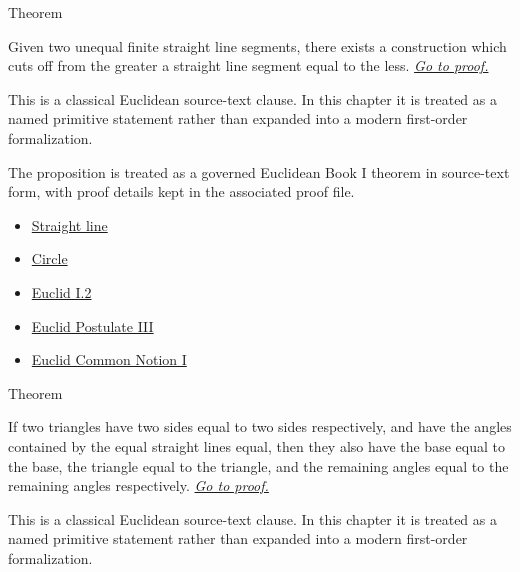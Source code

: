 \begin{theorembox}{Theorem}
\begin{theorem}
\label{thm:euclid-i-3}
\label{prop:I.3}
Given two unequal finite straight line segments, there exists a construction
which cuts off from the greater a straight line segment equal to the less.
\hyperref[prf:euclid-i-3]{\textit{Go to proof.}}
\end{theorem}
\end{theorembox}

\begin{remark*}
This is a classical Euclidean source-text clause. In this chapter it is treated
as a named primitive statement rather than expanded into a modern first-order
formalization.
\end{remark*}

\begin{remark*}[Interpretation]
The proposition is treated as a governed Euclidean Book I theorem in source-text
form, with proof details kept in the associated proof file.
\end{remark*}
\begin{lra-not-visible}
\begin{dependencies}
\begin{itemize}
  \item \hyperref[def:euclid-straight-line]{Straight line}
  \item \hyperref[def:euclid-circle]{Circle}
  \item \hyperref[thm:euclid-i-2]{Euclid I.2}
  \item \hyperref[ax:euclid-postulate-describe-circle]{Euclid Postulate III}
  \item \hyperref[ax:euclid-common-notion-things-equal-to-same]{Euclid Common Notion I}
\end{itemize}
\end{dependencies}
\end{lra-not-visible}

\begin{theorembox}{Theorem}
\begin{theorem}
\label{thm:euclid-i-4}
If two triangles have two sides equal to two sides respectively, and have the
angles contained by the equal straight lines equal, then they also have the
base equal to the base, the triangle equal to the triangle, and the remaining
angles equal to the remaining angles respectively.
\hyperref[prf:euclid-i-4]{\textit{Go to proof.}}
\end{theorem}
\end{theorembox}

\begin{remark*}
This is a classical Euclidean source-text clause. In this chapter it is treated
as a named primitive statement rather than expanded into a modern first-order
formalization.
\end{remark*}

